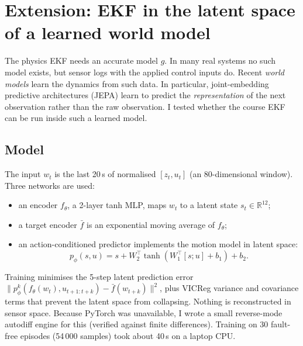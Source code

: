 \documentclass[11pt]{article}
\newcommand{\R}{\mathbb{R}}
\begin{document}
\section{Extension: EKF in the latent space of a learned world model}
The physics EKF needs an accurate model $g$. In many real systems no such model exists, but sensor logs with the applied control inputs do. Recent \emph{world models} learn the dynamics from such data. In particular, joint-embedding predictive architectures (JEPA) learn to predict the \emph{representation} of the next observation rather than the raw observation. I tested whether the course EKF can be run inside such a learned model.

\subsection{Model}
The input $w_t$ is the last 20\,s of normalised $[z_t,u_t]$ (an 80-dimensional window). Three networks are used:
\begin{itemize}\itemsep0pt
\item an encoder $f_\theta$, a 2-layer tanh MLP, maps $w_t$ to a latent state $s_t\in\R^{12}$;
\item a target encoder $\bar f$ is an exponential moving average of $f_\theta$;
\item an action-conditioned predictor implements the motion model in latent space:
\begin{equation}
p_\phi(s,u)=s+W_2^\top\tanh(W_1^\top[s;u]+b_1)+b_2 .
\end{equation}
\end{itemize}
Training minimises the 5-step latent prediction error $\|p_\phi^{k}(f_\theta(w_t),u_{t+1:t+k})-\bar f(w_{t+k})\|^2$, plus VICReg variance and covariance terms that prevent the latent space from collapsing. Nothing is reconstructed in sensor space. Because PyTorch was unavailable, I wrote a small reverse-mode autodiff engine for this (verified against finite differences). Training on 30 fault-free episodes (54\,000 samples) took about 40\,s on a laptop CPU.
\end{document}
